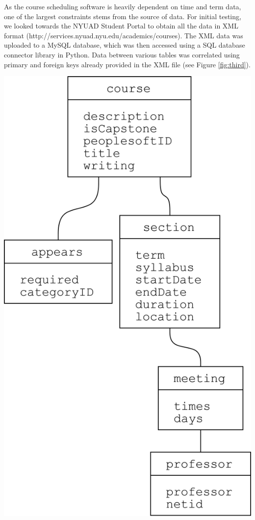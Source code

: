 \documentclass[a4paper, 11.5 pt, conference]{ieeeconf}  %
\begin{document}
\noindent As the course scheduling software is heavily dependent on time and term data, one of the largest constraints stems from the source of data. For initial testing, we looked towards the NYUAD Student Portal to obtain all the data in XML format (http://services.nyuad.nyu.edu/academics/courses). The XML data was uploaded to a MySQL database, which was then accessed using a SQL database connector library in Python. Data between various tables was correlated using primary and foreign keys already provided in the XML file (see Figure \ref{fig:third}).

\begingroup
    \medskip
    \centering
    \includegraphics[scale=0.35]{images/er-diagram.png}
    \label{fig:third}
    \medskip
\endgroup
\end{document}

